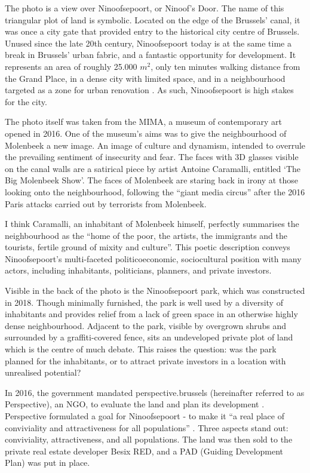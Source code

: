 \documentclass{article}[11pt]
\begin{document}
The photo is a view over Ninoofsepoort, or Ninoof's Door. The name of this triangular plot of land is symbolic. Located on the edge of the Brussels' canal, it was once a city gate that provided entry to the historical city centre of Brussels. Unused since the late 20th century, Ninoofsepoort today is at the same time a break in Brussels' urban fabric, and a fantastic opportunity for development. It represents an area of roughly 25.000 $m^2$, only ten minutes walking distance from the Grand Place, in a dense city with limited space, and in a neighbourhood targeted as a zone for urban renovation \parencite{perspective2020zru}. As such, Ninoofsepoort is high stakes for the city.

The photo itself was taken from the MIMA, a museum of contemporary art opened in 2016. One of the museum's aims was to give the neighbourhood of Molenbeek a new image. An image of culture and dynamism, intended to overrule the prevailing sentiment of insecurity and fear. The faces with 3D glasses visible on the canal walls are a satirical piece by artist Antoine Caramalli, entitled `The Big Molenbeek Show'. The faces of Molenbeek are staring back in irony at those looking onto the neighbourhood, following the ``giant media circus''\parencite{antoine2016canal} after the 2016 Paris attacks carried out by terrorists from Molenbeek.

I think Caramalli, an inhabitant of Molenbeek himself, perfectly summarises the neighbourhood as the ``home of the poor, the artists, the immigrants and the tourists, fertile ground of mixity and culture''\parencite{antoine2016canal}.
This poetic description conveys Ninoofsepoort's multi-faceted politicoeconomic, sociocultural position with many actors, including inhabitants, politicians, planners, and private investors.

Visible in the back of the photo is the Ninoofsepoort park, which was constructed in 2018. Though minimally furnished, the park is well used by a diversity of inhabitants and provides relief from a lack of green space in an otherwise highly dense neighbourhood.
Adjacent to the park, visible by overgrown shrubs and surrounded by a graffiti-covered fence, sits an undeveloped private plot of land which is the centre of much debate. 
This raises the question: was the park planned for the inhabitants, or to attract private investors in a location with unrealised potential?

In 2016, the government mandated perspective.brussels (hereinafter referred to as Perspective), an NGO, to evaluate the land and plan its development \parencite{diagnosticNinove}. Perspective formulated a goal for Ninoofsepoort - to make it ``a real place of conviviality and attractiveness for all populations'' \parencite{perspectiveNinove}. Three aspects stand out: conviviality, attractiveness, and all populations. 
The land was then sold to the private real estate developer Besix RED, and a PAD (Guiding Development Plan) was put in place.
\end{document}
